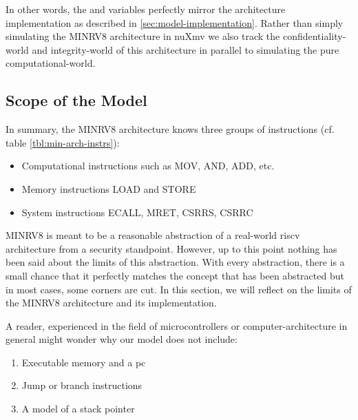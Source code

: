 In other words, the  and  variables perfectly mirror the architecture implementation as described in \ref{sec:model-implementation}.
Rather than simply simulating the MINRV8 architecture in nuXmv we also track the confidentiality-world and integrity-world of this architecture in parallel to simulating the pure computational-world.

\subsection{Scope of the Model}
\label{sec:model-scope}

In summary, the MINRV8 architecture knows three groups of instructions (cf. table \ref{tbl:min-arch-instrs}):
\begin{itemize}
    \item Computational instructions such as MOV, AND, ADD, etc.
    \item Memory instructions LOAD and STORE
    \item System instructions ECALL, MRET, CSRRS, CSRRC
\end{itemize}

MINRV8 is meant to be a reasonable abstraction of a real-world \gls{riscv} architecture from a security standpoint.
However, up to this point nothing has been said about the limits of this abstraction.
With every abstraction, there is a small chance that it perfectly matches the concept that has been abstracted but in most cases, some corners are cut.
In this section, we will reflect on the limits of the MINRV8 architecture and its implementation.


A reader, experienced in the field of microcontrollers or computer-architecture in general might wonder why our model does not include:
\begin{enumerate}
    \item Executable memory and a \gls{pc}
    \item Jump or branch instructions
    \item A model of a stack pointer
\end{enumerate}

